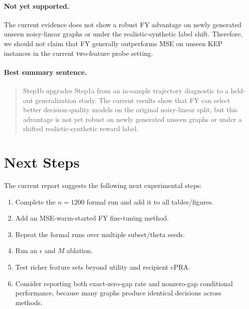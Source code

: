 \documentclass[11pt]{article}
\begin{document}
\paragraph{Not yet supported.}
The current evidence does not show a robust FY advantage on newly generated
unseen noisy-linear graphs or under the realistic-synthetic label shift.
Therefore, we should not claim that FY generally outperforms MSE on unseen KEP
instances in the current two-feature probe setting.

\paragraph{Best summary sentence.}
\begin{quote}
Step1b upgrades Step1a from an in-sample trajectory diagnostic to a held-out
generalization study. The current results show that FY can select better
decision-quality models on the original noisy-linear split, but this advantage is
not yet robust on newly generated unseen graphs or under a shifted
realistic-synthetic reward label.
\end{quote}

\section{Next Steps}

The current report suggests the following next experimental steps:

\begin{enumerate}
    \item Complete the \(n=1200\) formal run and add it to all tables/figures.
    \item Add an MSE-warm-started FY fine-tuning method.
    \item Repeat the formal runs over multiple subset/theta seeds.
    \item Run an \(\epsilon\) and \(M\) ablation.
    \item Test richer feature sets beyond utility and recipient cPRA.
    \item Consider reporting both exact-zero-gap rate and nonzero-gap
    conditional performance, because many graphs produce identical decisions
    across methods.
\end{enumerate}
\end{document}
